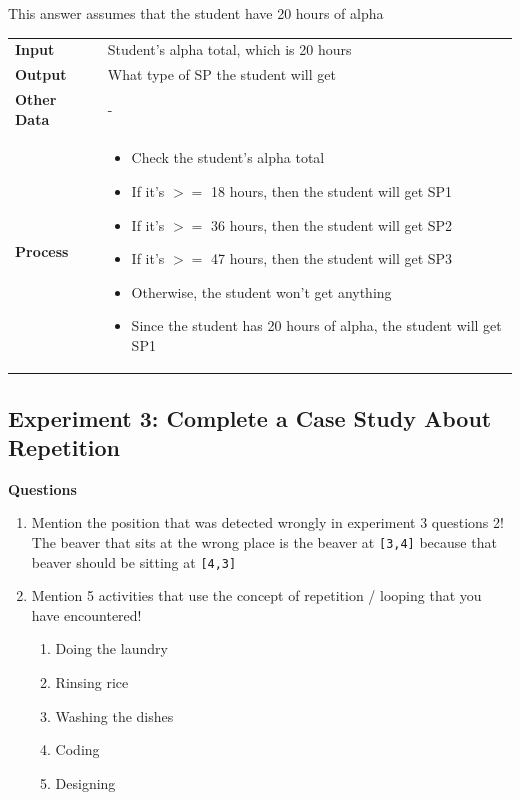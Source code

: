 \documentclass[12pt,titlepage]{article}
\newcommand{\details}[2]{
#1 & #2  \\
}
\begin{document}
\begin{enumerate}
{        This answer assumes that the student have 20 hours of alpha

        \begin{tabularx}{\textwidth}[t]{@{}>{\bfseries}l!{:}X}
            \details{Input}{Student's alpha total, which is 20 hours}
            \details{Output}{What type of SP the student will get}
            \details{Other Data}{-}
            \details{Process}{
                \begin{itemize}
                    \item Check the student's alpha total
                    \item If it's $>=$ 18 hours, then the student will get SP1
                    \item If it's $>=$ 36 hours, then the student will get SP2
                    \item If it's $>=$ 47 hours, then the student will get SP3
                    \item Otherwise, the student won't get anything
                    \item Since the student has 20 hours of alpha, the student will get SP1
                \end{itemize}
            }
        \end{tabularx}
       
    }
\end{enumerate}

\subsection{Experiment 3: Complete a Case Study About Repetition}
\textbf{Questions}
\begin{enumerate}
    \item {
        Mention the position that was detected wrongly in experiment 3 questions 2!\\
        The beaver that sits at the wrong place is the beaver at \texttt{[3,4]} because that beaver should be sitting at \texttt{[4,3]}
    }
    \item {
        Mention 5 activities that use the concept of repetition / looping that you have encountered!

        \begin{enumerate}
            \item Doing the laundry
            \item Rinsing rice
            \item Washing the dishes
            \item Coding
            \item Designing
        \end{enumerate}
    }
\end{enumerate}
\end{document}
